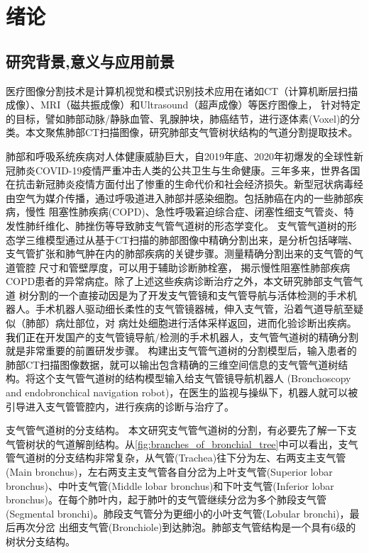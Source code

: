 
\chapter{绪论}\label{chap:introduction}

\section{研究背景,意义与应用前景}\label{sec:application_prospect}

医疗图像分割技术是计算机视觉和模式识别技术应用在诸如CT（计算机断层扫描成像）、MRI（磁共振成像）和Ultrasound（超声成像）等医疗图像上，
针对特定的目标，譬如肺部动脉/静脉血管、乳腺肿块，肺癌结节，进行逐体素(Voxel)的分类。本文聚焦肺部CT扫描图像，研究肺部支气管树状结构的气道分割提取技术。


肺部和呼吸系统疾病对人体健康威胁巨大，自2019年底、2020年初爆发的全球性新冠肺炎COVID-19疫情严重冲击人类的公共卫生与生命健康。三年多来，世界各国在抗击新冠肺炎疫情方面付出了惨重的生命代价和社会经济损失。新型冠状病毒经由空气为媒介传播，通过呼吸道进入肺部并感染细胞。包括肺癌在内的一些肺部疾病，慢性
阻塞性肺疾病(COPD)\cite{fetita2004pulmonary}、急性呼吸窘迫综合症\cite{howling1998significance}、闭塞性细支气管炎\cite{shaw2002role}、特发性肺纤维化\cite{wu2019computed}、肺挫伤\cite{li2019application}等导致肺支气管气道树的形态学变化。
支气管气道树的形态学三维模型通过从基于CT扫描的肺部图像中精确分割出来，是分析包括哮喘、支气管扩张和肺气肿在内的肺部疾病的关键步骤。测量精确分割出来的支气管的气道管腔
尺寸和管壁厚度，可以用于辅助诊断肺栓塞\cite{estepar2013computed}， 揭示慢性阻塞性肺部疾病COPD患者的异常病症。除了上述这些疾病诊断治疗之外，本文研究肺部支气管气道
树分割的一个直接动因是为了开发支气管镜和支气管导航与活体检测的手术机器人。手术机器人驱动细长柔性的支气管镜器械，伸入支气管，沿着气道导航至疑似（肺部）病灶部位，对
病灶处细胞进行活体采样返回，进而化验诊断出疾病。\textcolor{black}{我们正在}开发国产的支气管镜导航/检测的手术机器人，支气管气道树的精确分割就是非常重要的前置研发步骤。
构建出支气管气道树的分割模型后，输入患者的肺部CT扫描图像数据，就可以输出包含精确的三维空间信息的支气管气道树结构。将这个支气管气道树的结构模型输入给支气管镜导航机器人
(Bronchoscopy and endobronchical navigation robot)，在医生的监视与操纵下，机器人就可以被引导进入支气管管腔内，进行疾病的诊断与治疗了。

{\heiti 支气管气道树的分支结构。} 本文研究支气管气道树的分割，有必要先了解一下支气管树状的气道解剖结构。从\autoref{fig:branches_of_bronchial_tree}中可以看出，支气管气道树的分支结构非常复杂，从气管(Trachea)往下分为左、右两支主支气管(Main bronchus)，左右两支主支气管各自分岔为上叶支气管(Superior lobar bronchus)、中叶支气管(Middle lobar bronchus)和下叶支气管(Inferior
 lobar bronchus)。在每个肺叶内，起于肺叶的支气管继续分岔为多个肺段支气管(Segmental bronchi)。肺段支气管分为更细小的小叶支气管(Lobular bronchi)，最后再次分岔
 出细支气管(Bronchiole)到达肺泡。肺部支气管结构是一个具有6级的树状分支结构。

